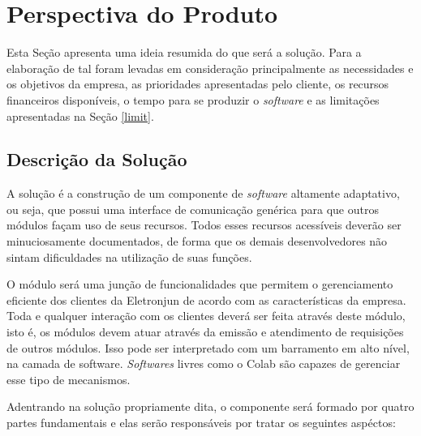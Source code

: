   \section{Perspectiva do Produto}
Esta Seção apresenta uma ideia resumida do que será a solução. Para a elaboração de tal foram levadas em consideração principalmente as necessidades e os objetivos da empresa, as prioridades apresentadas pelo cliente, os recursos financeiros disponíveis, o tempo para se produzir o \textit{software} e as limitações apresentadas na Seção \ref{limit}.

    \subsection{Descrição da Solução}
A solução é a construção de um componente de \textit{software} altamente adaptativo, ou seja, que possui uma interface de comunicação genérica para que outros módulos façam uso de seus recursos. Todos esses recursos acessíveis deverão ser minuciosamente documentados, de forma que os demais desenvolvedores não sintam dificuldades na utilização de suas funções.

O módulo será uma junção de funcionalidades que permitem o gerenciamento eficiente dos clientes da Eletronjun de acordo com as características da empresa. Toda e qualquer interação com os clientes deverá ser feita através deste módulo, isto é, os módulos devem atuar através da emissão e atendimento de requisições de outros módulos. Isso pode ser interpretado com um barramento em alto nível, na camada de software. \textit{Softwares} livres como o Colab são capazes de gerenciar esse tipo de mecanismos.

Adentrando na solução propriamente dita, o componente será formado por quatro partes fundamentais e elas serão responsáveis por tratar os seguintes aspéctos:

